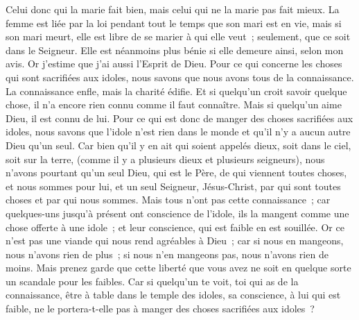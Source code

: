 \begin{multicols}{2}
Celui donc qui la marie fait bien, mais celui qui ne la marie pas fait mieux.
La femme est liée par la loi pendant tout le temps que son mari est en vie, mais si son mari meurt, elle est libre de se marier à qui elle veut~; seulement, que ce soit dans le Seigneur.
Elle est néanmoins plus bénie si elle demeure ainsi, selon mon avis. Or j'estime que j'ai aussi l'Esprit de Dieu.
\VerseOne{}Pour ce qui concerne les choses qui sont sacrifiées aux idoles, nous savons que nous avons tous de la connaissance. La connaissance enfle, mais la charité édifie.
Et si quelqu'un croit savoir quelque chose, il n'a encore rien connu comme il faut connaître.
Mais si quelqu'un aime Dieu, il est connu de lui.
Pour ce qui est donc de manger des choses sacrifiées aux idoles, nous savons que l'idole n'est rien dans le monde et qu'il n'y a aucun autre Dieu qu'un seul.
Car bien qu'il y en ait qui soient appelés dieux, soit dans le ciel, soit sur la terre, (comme il y a plusieurs dieux et plusieurs seigneurs),
nous n'avons pourtant qu'un seul Dieu, qui est le Père, de qui viennent toutes choses, et nous sommes pour lui, et un seul Seigneur, Jésus-Christ, par qui sont toutes choses et par qui nous sommes.
Mais tous n'ont pas cette connaissance~; car quelques-uns jusqu'à présent ont conscience de l'idole, ils la mangent comme une chose offerte à une idole~; et leur conscience, qui est faible en est souillée.
Or ce n'est pas une viande qui nous rend agréables à Dieu~; car si nous en mangeons, nous n'avons rien de plus~; si nous n'en mangeons pas, nous n'avons rien de moins.
Mais prenez garde que cette liberté que vous avez ne soit en quelque sorte un scandale pour les faibles.
Car si quelqu'un te voit, toi qui as de la connaissance, être à table dans le temple des idoles, sa conscience, à lui qui est faible, ne le portera-t-elle pas à manger des choses sacrifiées aux idoles~?

\end{multicols}
